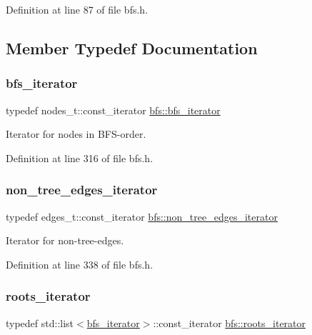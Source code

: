 Definition at line 87 of file bfs.\+h.



\subsection{Member Typedef Documentation}
\mbox{\label{classbfs_a1035f068a96de0370789ec315aef4f73}} 
\subsubsection{\texorpdfstring{bfs\+\_\+iterator}{bfs\_iterator}}
{\footnotesize\ttfamily typedef nodes\+\_\+t\+::const\+\_\+iterator \mbox{\hyperlink{classbfs_a1035f068a96de0370789ec315aef4f73}{bfs\+::bfs\+\_\+iterator}}}



Iterator for nodes in B\+F\+S-\/order. 



Definition at line 316 of file bfs.\+h.

\mbox{\label{classbfs_a89ec32919076618d9eef18990fef543f}} 
\subsubsection{\texorpdfstring{non\+\_\+tree\+\_\+edges\+\_\+iterator}{non\_tree\_edges\_iterator}}
{\footnotesize\ttfamily typedef edges\+\_\+t\+::const\+\_\+iterator \mbox{\hyperlink{classbfs_a89ec32919076618d9eef18990fef543f}{bfs\+::non\+\_\+tree\+\_\+edges\+\_\+iterator}}}



Iterator for non-\/tree-\/edges. 



Definition at line 338 of file bfs.\+h.

\mbox{\label{classbfs_a70b915179053a2993154614d4358fdc1}} 
\subsubsection{\texorpdfstring{roots\+\_\+iterator}{roots\_iterator}}
{\footnotesize\ttfamily typedef std\+::list$<$\mbox{\hyperlink{classbfs_a1035f068a96de0370789ec315aef4f73}{bfs\+\_\+iterator}}$>$\+::const\+\_\+iterator \mbox{\hyperlink{classbfs_a70b915179053a2993154614d4358fdc1}{bfs\+::roots\+\_\+iterator}}}



